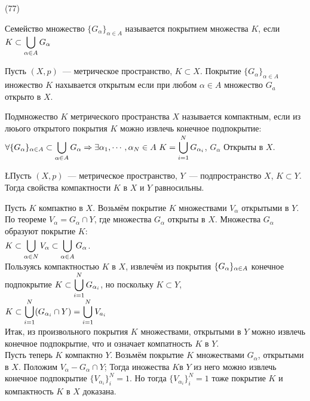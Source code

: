 (77)

\Op Семейство множество $\{G_\alpha\}_{\alpha \in A}$ называется покрытием множества $K$, если $K \subset \ds\bigcup_{\alpha \in A} G_\alpha$

\Op Пусть $(X, p)$~--- метрическое пространство, $K \subset X$. Покрытие $\{G_\alpha\}_{\alpha \in A}$ иножество $K$ нахывается открытым если при любом $\alpha \in A$ множество $G_a$ открыто в $X$.

\Op Подмножество $K$ метрического пространства $X$ называется компактным, если из люього открытого покрытия $K$ можно извлечь конечное подпокрытие:\\
$\forall\{G_\alpha\}_{\alpha \in A} \subset \ds\bigcup\limits_{\alpha\in A}G_\alpha \Ra \exists\alpha_1, \cdots, \alpha_N \in A\ K = \bigcup^N_{i = 1} G_{\alpha_i}$, $G_\alpha$ Открыты в $X$.

\L Пусть $(X, p)$~--- метрическое пространство, $Y$~--- подпространство $X$, $K \subset Y$. Тогда свойства компактности $K$ в $X$ и $Y$ равносильны.

\D Пусть $K$ компактно в $X$. Возьмём покрытие $K$ множествами $V_\alpha$ открытыми в $Y$. По теореме $V_\alpha = G_\alpha \cap Y$, где множества $G_\alpha$ открыты в $X$. Множества $G_\alpha$ образуют покрытие $K$:\\
$K \subset \dsl \bigcup{\alpha \in N}{} V_\alpha \subset \dsl\bigcup{\alpha \in A}{} G_\alpha$.\\
Пользуясь компактностью $K$ в $X$, извлечём из покрытия $\iseq G\alpha A$ конечное подпокрытие $K \subset \dsl \bigcup{i = 1}N G_{\alpha_i}$, но поскольку $K\subset Y$,\\
$K \subset \dsl\bigcup{i=1}{N}(G_{\alpha_i}\cap Y) = \dsl \bigcup{i = 1}N V_{a_i}$\\
Итак, из произвольного покрытия $K$ множествами, открытыми в $Y$ можно извлечь конечное подпокрытие, что и означает компатность $K$ в $Y$.\\
Пусть теперь $K$ компактно $Y$. Возьмём покрытие $K$ множествами $G_\alpha$, открытыми в $X$. Положим $V_\alpha - G_\alpha \cap Y$; Тогда иножества $K$в $Y$ из него можно извлечь конечное подпокрытие $\{V_{\alpha_i}\}^N_i = 1$. Но тогда $\{V_{\alpha_i}\}^N_i = 1$ тоже покрытие $K$ и компактность $K$ в $X$ доказана.